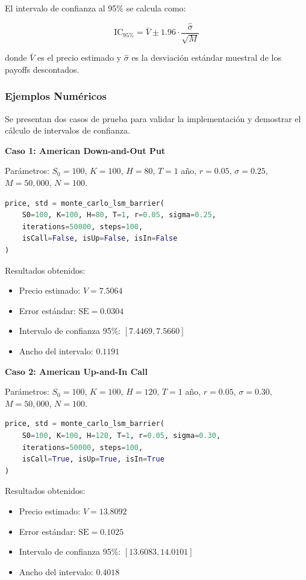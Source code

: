 El intervalo de confianza al 95\% se calcula como:

\begin{equation}
\text{IC}_{95\%} = \bar{V} \pm 1.96 \cdot \frac{\hat{\sigma}}{\sqrt{M}}
\end{equation}

donde $\bar{V}$ es el precio estimado y $\hat{\sigma}$ es la desviación estándar muestral de los payoffs descontados.

\subsubsection{Ejemplos Numéricos}

Se presentan dos casos de prueba para validar la implementación y demostrar el cálculo de intervalos de confianza.

\textbf{Caso 1: American Down-and-Out Put}

Parámetros: $S_0 = 100$, $K = 100$, $H = 80$, $T = 1$ año, $r = 0.05$, $\sigma = 0.25$, $M = 50,000$, $N = 100$.

\begin{lstlisting}[language=Python]
price, std = monte_carlo_lsm_barrier(
    S0=100, K=100, H=80, T=1, r=0.05, sigma=0.25,
    iterations=50000, steps=100,
    isCall=False, isUp=False, isIn=False
)
\end{lstlisting}

Resultados obtenidos:
\begin{itemize}
    \item Precio estimado: $V = 7.5064$
    \item Error estándar: $\text{SE} = 0.0304$
    \item Intervalo de confianza 95\%: $[7.4469, 7.5660]$
    \item Ancho del intervalo: $0.1191$
\end{itemize}

\textbf{Caso 2: American Up-and-In Call}

Parámetros: $S_0 = 100$, $K = 100$, $H = 120$, $T = 1$ año, $r = 0.05$, $\sigma = 0.30$, $M = 50,000$, $N = 100$.

\begin{lstlisting}[language=Python]
price, std = monte_carlo_lsm_barrier(
    S0=100, K=100, H=120, T=1, r=0.05, sigma=0.30,
    iterations=50000, steps=100,
    isCall=True, isUp=True, isIn=True
)
\end{lstlisting}

Resultados obtenidos:
\begin{itemize}
    \item Precio estimado: $V = 13.8092$
    \item Error estándar: $\text{SE} = 0.1025$
    \item Intervalo de confianza 95\%: $[13.6083, 14.0101]$
    \item Ancho del intervalo: $0.4018$
\end{itemize}

